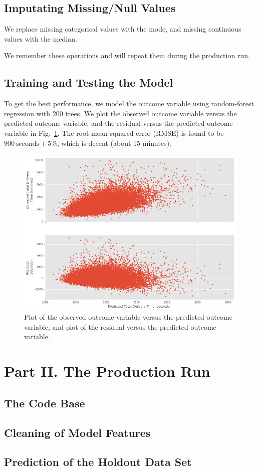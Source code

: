 \documentclass[12pt]{article}
\begin{document}
\subsection{Imputating Missing/Null Values}

We replace missing categorical values with the mode, and missing continuous values with the median.

We remember these operations and will repeat them during the production run.

\subsection{Training and Testing the Model}
To get the best performance, we model the outcome variable using random-forest regression with 200 trees.
We plot the observed outcome variable versus the predicted outcome variable, and the residual versus the predicted outcome variable in Fig.~\ref{fig:results01}.  The root-mean-squared error (RMSE) is found to be $900~\text{seconds} \pm 5\%$, which is decent (about 15 minutes).


\begin{figure}[H]
\centering
\includegraphics[width=6in]{graphics/results.png}
\caption{Plot of the observed outcome variable versus the predicted outcome variable, and plot of the residual versus the predicted outcome variable.}
\label{fig:results01}
\end{figure}






\section{Part II. The Production Run}

\subsection{The Code Base}



\subsection{Cleaning of Model Features}


\subsection{Prediction of the Holdout Data Set}
\end{document}
